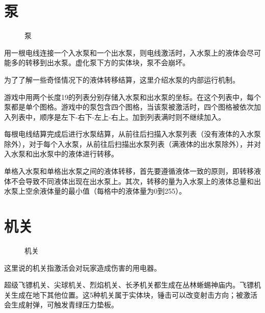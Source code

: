 \section{泵}
\begin{figure}[!ht]
  \centering
  \qquad
  \caption{泵}
\end{figure}
用一根电线连接一个入水泵和一个出水泵，则电线激活时，入水泵上的液体会尽可能多的转移到出水泵。虚化泵下方的实体块，泵不会崩坏。

为了了解一些奇怪情况下的液体转移结算，这里介绍水泵的内部运行机制。

游戏中用两个长度19的列表分别存储入水泵和出水泵的坐标。在这个列表中，每个泵都是单个图格。游戏中的泵包含四个图格，当该泵被激活时，四个图格被依次加入列表中，顺序是左下-右下-左上-右上。加到列表满时则不继续加入。

每根电线结算完成后进行水泵结算，从前往后扫描入水泵列表（没有液体的入水泵除外），对于每个入水泵，从前往后扫描出水泵列表（满液体的出水泵除外），并对入水泵和出水泵中的液体进行转移。

单格入水泵和单格出水泵之间的液体转移，首先要遵循液体一致的原则，即转移液体不会导致不同液体出现在出水泵上。其次，转移的量为入水泵上的液体总量和出水泵上空余液体量的最小值（每格中的液体量为0到255）。

\section{机关}
\begin{figure}[!ht]
  \centering
  \qquad
  \qquad
  \qquad
  \qquad
  \qquad
  \qquad
  \qquad
  \caption{机关}
\end{figure}
这里说的机关指激活会对玩家造成伤害的用电器。

超级飞镖机关、尖球机关、烈焰机关、长矛机关都生成在丛林蜥蜴神庙内。飞镖机关生成在地下其他位置。这5种机关属于实体块，锤击可以改变射击方向；被激活会生成射弹，可触发青绿压力垫板。

